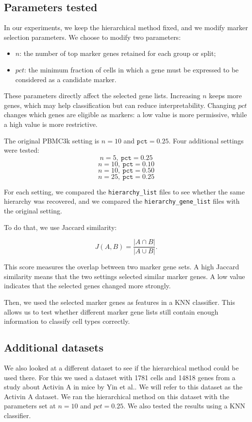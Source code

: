 \documentclass[11pt,a4paper]{article}
\begin{document}
\subsection{Parameters tested}

In our experiments, we keep the hierarchical method fixed, and we modify marker selection parameters.
We choose to modify two parameters:

\begin{itemize}[leftmargin=1.5em]
    \item $n$: the number of top marker genes retained for each group or split;
    \item $pct$: the minimum fraction of cells in which a gene must be expressed to be considered as a candidate marker.
\end{itemize}

These parameters directly affect the selected gene lists.
Increasing $n$ keeps more genes, which may help classification but can reduce interpretability.
Changing $pct$ changes which genes are eligible as markers: a low value is more permissive, while a high value is more restrictive.

The original PBMC3k setting is $n=10$ and $\texttt{pct}=0.25$.
Four additional settings were tested: 
$$n=5,\ \texttt{pct}=0.25$$
$$n=10,\ \texttt{pct}=0.10$$
$$n=10,\ \texttt{pct}=0.50$$
$$n=25,\ \texttt{pct}=0.25$$

For each setting, we compared the \texttt{hierarchy\_list} files to see whether the same hierarchy was recovered, and we compared the \texttt{hierarchy\_gene\_list} files with the original setting. 

To do that, we use Jaccard similarity:

\[
J(A,B) = \frac{|A \cap B|}{|A \cup B|}.
\]

This score measures the overlap between two marker gene sets.
A high Jaccard similarity means that the two settings selected similar marker genes.
A low value indicates that the selected genes changed more strongly. 

Then, we used the selected marker genes as features in a KNN classifier.
This allows us to test whether different marker gene lists still contain enough information to classify cell types correctly.

\subsection{Additional datasets}

We also looked at a different dataset to see if the hierarchical method could be used there.
For this we used a dataset with 1781 cells and 14818 genes from a study about Activin A in mice by Yin et al.\cite{yin2026}.
We will refer to this dataset as the Activin A dataset.
We ran the hierarchical method on this dataset with the parameters set at $n=10$ and $pct=0.25$.
We also tested the results using a KNN classifier.
\end{document}
